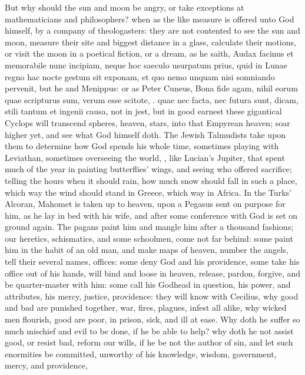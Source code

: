 {But why should the sun and moon be angry, or take exceptions at
mathematicians and philosophers? when as the like measure is offered
unto God himself, by a company of theologasters: they are not contented
to see the sun and moon, measure their site and biggest distance in a
glass, calculate their motions, or visit the moon in a poetical
fiction, or a dream, as he saith, Audax facinus et memorabile
nunc incipiam, neque hoc saeculo usurpatum prius, quid in Lunae regno
hac nocte gestum sit exponam, et quo nemo unquam nisi somniando
pervenit, but he and Menippus: or as Peter Cuneus, Bona
fide agam, nihil eorum quae scripturus sum, verum esse scitote, \etc{}.
quae nec facta, nec futura sunt, dicam, stili tantum et ingenii
causa, not in jest, but in good earnest these gigantical Cyclops will
transcend spheres, heaven, stars, into that Empyrean heaven; soar
higher yet, and see what God himself doth. The Jewish Talmudists take
upon them to determine how God spends his whole time, sometimes playing
with Leviathan, sometimes overseeing the world, \etc{}, like Lucian's
Jupiter, that spent much of the year in painting butterflies' wings,
and seeing who offered sacrifice; telling the hours when it should
rain, how much snow should fall in such a place, which way the wind
should stand in Greece, which way in Africa. In the Turks' Alcoran,
Mahomet is taken up to heaven, upon a Pegasus sent on purpose for him,
as he lay in bed with his wife, and after some conference with God is
set on ground again. The pagans paint him and mangle him after a
thousand fashions; our heretics, schismatics, and some schoolmen, come
not far behind: some paint him in the habit of an old man, and make
maps of heaven, number the angels, tell their several names,
offices: some deny God and his providence, some take his office out of
his hands, will bind and loose in heaven, release, pardon,
forgive, and be quarter-master with him: some call his Godhead in
question, his power, and attributes, his mercy, justice, providence:
they will know with Cecilius, why good and bad are punished
together, war, fires, plagues, infest all alike, why wicked men
flourish, good are poor, in prison, sick, and ill at ease. Why doth he
suffer so much mischief and evil to be done, if he be able to
help? why doth he not assist good, or resist bad, reform our wills, if
he be not the author of sin, and let such enormities be committed,
unworthy of his knowledge, wisdom, government, mercy, and providence,
}
